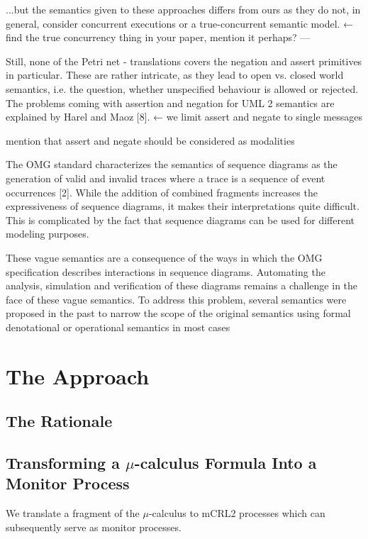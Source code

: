 \documentclass[letter]{llncs}
\begin{document}
...but the semantics given to these approaches differs from ours as they do not,
in general, consider concurrent executions or a true-concurrent semantic model.
← find the true concurrency thing in your paper, mention it perhaps?
---

Still, none of the Petri net - translations covers the negation
and assert primitives in particular. These are rather intricate,
as they lead to open vs. closed world semantics, i.e. the
question, whether unspecified behaviour is allowed or rejected.
The problems coming with assertion and negation for UML 2
semantics are explained by Harel and Maoz [8]. ← we limit assert and negate to single messages

mention that assert and negate should be considered as modalities

The OMG standard characterizes the semantics of sequence
diagrams as the generation of valid and invalid traces where a
trace is a sequence of event occurrences [2]. While the addition
of combined fragments increases the expressiveness of sequence
diagrams, it makes their interpretations quite difficult. This is
complicated by the fact that sequence diagrams can be used for
different modeling purposes. 

These vague semantics are a consequence of the ways in
which the OMG specification describes interactions in sequence
diagrams. Automating the analysis, simulation and verification of
these diagrams remains a challenge in the face of these vague
semantics. To address this problem, several semantics were
proposed in the past to narrow the scope of the original semantics
using formal denotational or operational semantics in most cases

\section{The Approach}
\label{sec:Approach}

\subsection{The Rationale}
\subsection{Transforming a $\mu$-calculus Formula Into a Monitor Process} 
We translate a fragment of the $\mu$-calculus to mCRL2 processes which
can subsequently serve as monitor processes.
\end{document}
